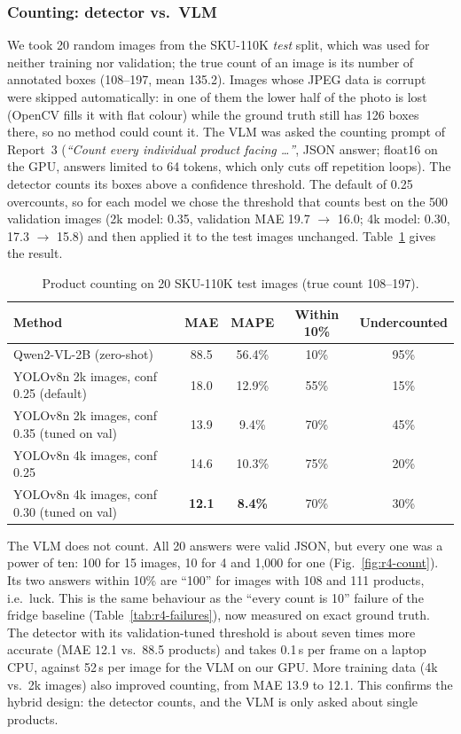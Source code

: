 \subsubsection{Counting: detector vs.\ VLM}\label{sec:r4-count}
We took 20 random images from the SKU-110K \emph{test} split, which was used for neither training
nor validation; the true count of an image is its number of annotated boxes (108--197, mean 135.2).
Images whose JPEG data is corrupt were skipped automatically: in one of them the lower half of the
photo is lost (OpenCV fills it with flat colour) while the ground truth still has 126 boxes there, so
no method could count it.
The VLM was asked the counting prompt of Report~3 (\emph{``Count every individual product facing
\ldots''}, JSON answer; float16 on the GPU, answers limited to 64 tokens, which only cuts off
repetition loops). The detector counts its boxes above a confidence threshold. The default of
0.25 overcounts, so for each model we chose the threshold that counts best on the 500 validation
images (2k model: 0.35, validation MAE 19.7 $\rightarrow$ 16.0; 4k model: 0.30, 17.3 $\rightarrow$
15.8) and then applied it to the test images unchanged.
Table~\ref{tab:r4-count} gives the result.

\begin{table}[!t]
\centering
\caption{Product counting on 20 SKU-110K test images (true count 108--197).}
\label{tab:r4-count}
\begin{tabular}{lcccc}
\hline
Method & MAE & MAPE & Within 10\% & Undercounted \\
\hline
Qwen2-VL-2B (zero-shot) & 88.5 & 56.4\% & 10\% & 95\% \\
YOLOv8n 2k images, conf 0.25 (default) & 18.0 & 12.9\% & 55\% & 15\% \\
YOLOv8n 2k images, conf 0.35 (tuned on val) & 13.9 & 9.4\% & 70\% & 45\% \\
YOLOv8n 4k images, conf 0.25 & 14.6 & 10.3\% & 75\% & 20\% \\
YOLOv8n 4k images, conf 0.30 (tuned on val) & \textbf{12.1} & \textbf{8.4\%} & 70\% & 30\% \\
\hline
\end{tabular}
\end{table}

The VLM does not count. All 20 answers were valid JSON, but every one was a power of ten: 100 for
15 images, 10 for 4 and 1{,}000 for one (Fig.~\ref{fig:r4-count}). Its two answers within 10\% are
``100'' for images with 108 and 111 products, i.e.\ luck. This is the same behaviour as the
``every count is 10'' failure of the fridge baseline (Table~\ref{tab:r4-failures}), now measured
on exact ground truth. The detector with its validation-tuned threshold is about seven times more
accurate (MAE 12.1 vs.\ 88.5 products) and takes 0.1\,s per frame on a laptop CPU, against 52\,s
per image for the VLM on our GPU. More training data (4k vs.\ 2k images) also improved counting,
from MAE 13.9 to 12.1. This confirms the hybrid design: the detector counts, and the VLM is only
asked about single products.

